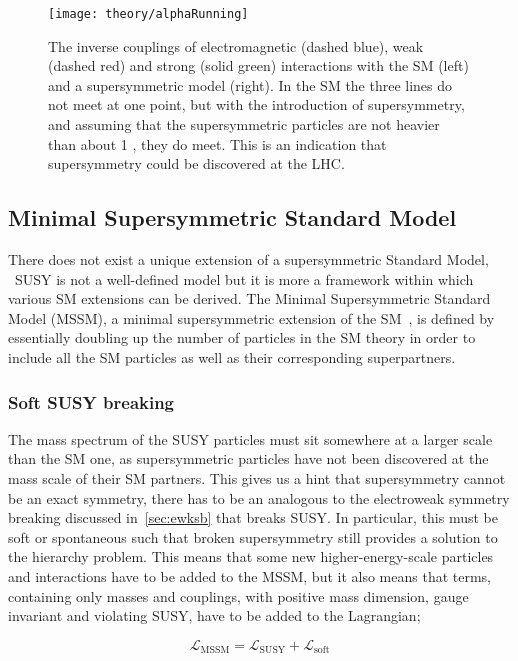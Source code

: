 			\begin{figure}[!htb]
				\centering
				\texttt{[image: theory/alphaRunning]}
				\caption{\label{fig:alphaRunning} The inverse couplings of electromagnetic (dashed blue), weak (dashed red) and strong (solid green) interactions with the SM (left) and a supersymmetric model (right). In the SM the three lines do not meet at one point, but with the introduction of supersymmetry, and assuming that the supersymmetric particles are not heavier than about 1 \TeV, they do meet. This is an indication that supersymmetry could be discovered at the LHC.}
			\end{figure}



		\subsection{Minimal Supersymmetric Standard Model}
		\label{sec:MSSM}
			
			There does not exist a unique extension of a supersymmetric Standard Model, \ie\ SUSY is not a well-defined model but it is more a framework within which various SM extensions can be derived.
			The Minimal Supersymmetric Standard Model (MSSM), a minimal supersymmetric extension of the SM~\cite{Jegerlehner:2013nna}, is defined by essentially doubling up the number of particles in the SM theory in order to include all the SM particles as well as their corresponding superpartners.

			\subsubsection*{Soft SUSY breaking}
				
				The mass spectrum of the SUSY particles must sit somewhere at a larger scale than the SM one, as supersymmetric particles have not been discovered at the mass scale of their SM partners. This gives us a hint that supersymmetry cannot be an exact symmetry, there has to be an analogous to the electroweak symmetry breaking discussed in~\ref{sec:ewksb} that breaks SUSY. In particular, this must be soft or spontaneous such that broken supersymmetry still provides a solution to the hierarchy problem. This means that some new higher-energy-scale particles and interactions have to be added to the MSSM, but it also means that terms, containing only masses and couplings, with positive mass dimension, gauge invariant and violating SUSY, have to be added to the Lagrangian;

				\begin{equation}
				\label{eq:soft_sb}
					\mathcal L_{\mathrm{MSSM}} = \mathcal {L_{\mathrm{SUSY}}} + \mathcal {L_{\mathrm{soft}}}
				\end{equation}

